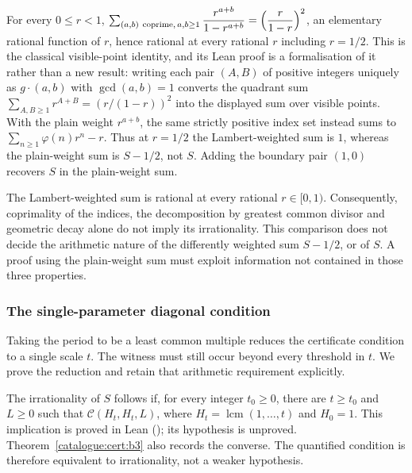 \begin{thm}\label{thm:classical-coprime-pair-lambert-identity}
For every $0\le r<1$, $\sum_{(a,b)\ \mathrm{coprime},\, a,b\ge 1}
\dfrac{r^{a+b}}{1-r^{a+b}} = \Bigl(\dfrac{r}{1-r}\Bigr)^2$, an elementary
rational function of $r$, hence rational at every rational $r$ including
$r=1/2$. This is the classical visible-point identity, and its Lean proof is a formalisation of it rather than a new result: writing each
pair $(A,B)$ of positive integers uniquely as $g\cdot(a,b)$ with
$\gcd(a,b)=1$ converts the quadrant sum $\sum_{A,B\ge1}r^{A+B}=(r/(1-r))^2$
into the displayed sum over visible points. With the plain weight
$r^{a+b}$, the same strictly positive index set instead sums to
$\sum_{n\ge1}\varphi(n)r^n-r$. Thus at $r=1/2$ the Lambert-weighted
sum is $1$, whereas the plain-weight sum is $S-1/2$, not $S$.
Adding the boundary pair $(1,0)$ recovers $S$ in the plain-weight sum.
\end{thm}

\begin{obs}
The Lambert-weighted sum is rational at every rational $r\in[0,1)$.
Consequently, coprimality of the indices, the decomposition by greatest
common divisor and geometric decay alone do not imply its irrationality.
This comparison does not decide the arithmetic nature of the differently
weighted sum $S-1/2$, or of $S$. A proof using the plain-weight sum must
exploit information not contained in those three properties.
\end{obs}

\subsubsection{The single-parameter diagonal condition}

Taking the period to be a least common multiple reduces the certificate
condition to a single scale $t$. The witness must still occur beyond
every threshold in $t$. We prove the reduction and retain that arithmetic
requirement explicitly.


\begin{obs}
The irrationality of $S$ follows if, for every integer $t_0\ge0$, there
are $t\ge t_0$ and $L\ge0$ such that $\mathcal C(H_t,H_t,L)$, where
$H_t=\operatorname{lcm}(1,\ldots,t)$ and $H_0=1$. This implication is
proved in Lean
();
its hypothesis is unproved. Theorem~\ref{catalogue:cert:b3} also records the
converse. The quantified condition is therefore equivalent to
irrationality, not a weaker hypothesis.
\end{obs}

